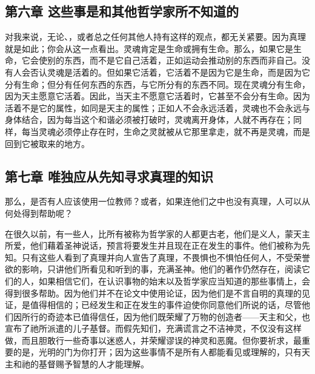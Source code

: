 
\subsection{第六章 这些事是和其他哲学家所不知道的}

对我来说，无论、，或者总之任何其他人持有这样的观点，都无关紧要。因为真理就是如此；你会从这一点看出。灵魂肯定是生命或拥有生命。那么，如果它是生命，它会使别的东西，而不是它自己活着，正如运动会推动别的东西而非自己。没有人会否认灵魂是活着的。但如果它活着，它活着不是因为它是生命，而是因为它分有生命；但分有任何东西的东西，与它所分有的东西不同。现在灵魂分有生命，因为天主愿意它活着。因此，当天主不愿意它活着时，它甚至不会分有生命。因为活着不是它的属性，如同是天主的属性；正如人不会永远活着，灵魂也不会永远与身体结合，因为每当这个和谐必须被打破时，灵魂离开身体，人就不再存在；同样，每当灵魂必须停止存在时，生命之灵就被从它那里拿走，就不再是灵魂，而是回到它被取来的地方。\par


\subsection{第七章 唯独应从先知寻求真理的知识}

那么，是否有人应该使用一位教师？或者，如果连他们之中也没有真理，人可以从何处得到帮助呢？\par

在很久以前，有一些人，比所有被称为哲学家的人都更古老，他们是义人，蒙天主所爱，他们藉着圣神说话，预言将要发生并且现在正在发生的事件。他们被称为先知。只有这些人看到了真理并向人宣告了真理，不畏惧也不惧怕任何人，不受荣誉欲的影响，只讲他们所看见和听到的事，充满圣神。他们的著作仍然存在，阅读它们的人，如果相信它们，在认识事物的始末以及哲学家应当知道的那些事情上，会得到很多帮助。因为他们并不在论文中使用论证，因为他们是不言自明的真理的见证，是值得相信的；已经发生和正在发生的事件迫使你同意他们所说的话，尽管他们因所行的奇迹本已值得信任，因为他们既荣耀了万物的创造者——天主和父，也宣布了祂所派遣的儿子基督。而假先知们，充满谎言之不洁神灵，不仅没有这样做，而且胆敢行一些奇事以迷惑人，并荣耀谬误的神灵和恶魔。但你要祈求，最重要的是，光明的门为你打开；因为这些事情不是所有人都能看见或理解的，只有天主和祂的基督赐予智慧的人才能理解。\par

